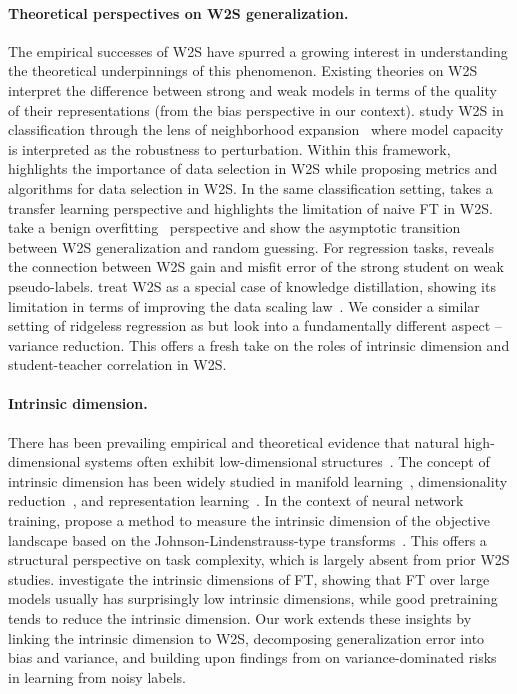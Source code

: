 \paragraph{Theoretical perspectives on W2S generalization.} 
The empirical successes of W2S have spurred a growing interest in understanding the theoretical underpinnings of this phenomenon. Existing theories on W2S interpret the difference between strong and weak models in terms of the quality of their representations (from the bias perspective in our context). 
\citet{lang2024theoretical} study W2S in classification through the lens of neighborhood expansion~\citep{wei2020theoretical,cai2021theory} where model capacity is interpreted as the robustness to perturbation.
Within this framework, \citet{shin2024weak} highlights the importance of data selection in W2S while proposing metrics and algorithms for data selection in W2S.
In the same classification setting, \citet{somerstep2024statistical} takes a transfer learning perspective and highlights the limitation of naive FT in W2S.
\citet{wu2024provable} take a benign overfitting~\citep{bartlett2020benign,muthukumar2021classification} perspective and show the asymptotic transition between W2S generalization and random guessing.
For regression tasks, \citet{Charikar2024QuantifyingTG} reveals the connection between W2S gain and misfit error of the strong student on weak pseudo-labels.
\citet{ildiz2024high} treat W2S as a special case of knowledge distillation, showing its limitation in terms of improving the data scaling law~\citep{spigler2020asymptotic,bahri2024explaining}.
We consider a similar setting of ridgeless regression as \citet{ildiz2024high} but look into a fundamentally different aspect -- variance reduction. This offers a fresh take on the roles of intrinsic dimension and student-teacher correlation in W2S. 

\paragraph{Intrinsic dimension.} 
There has been prevailing empirical and theoretical evidence that natural high-dimensional systems often exhibit low-dimensional structures~\citep{udell2019big}.
The concept of intrinsic dimension has been widely studied in manifold learning~\citep{tenenbaum2000global}, dimensionality reduction~\citep{van2008visualizing}, and representation learning~\citep{bengio2013representation}.
In the context of neural network training, \citet{li2018measuring} propose a method to measure the intrinsic dimension of the objective landscape based on the Johnson-Lindenstrauss-type transforms~\citep{johnson1984extensions}. 
This offers a structural perspective on task complexity, which is largely absent from prior W2S studies. 
\citet{aghajanyan2020intrinsic} investigate the intrinsic dimensions of FT, showing that FT over large models usually has surprisingly low intrinsic dimensions, while good pretraining tends to reduce the intrinsic dimension.
Our work extends these insights by linking the intrinsic dimension to W2S, decomposing generalization error into bias and variance, and building upon findings from \citet{yang2020rethinking, amari2020does} on variance-dominated risks in learning from noisy labels.



